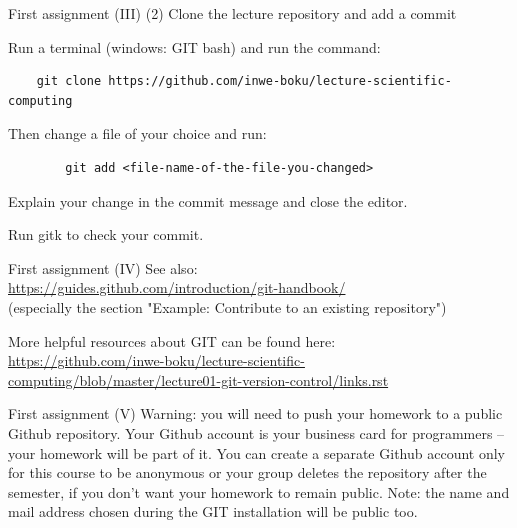 \documentclass[10pt,color=usenames,dvipsnames]{beamer}
\begin{document}
\begin{frame}[fragile]{First assignment (III)}
	(2) Clone the lecture repository and add a commit

	Run a terminal (windows: GIT bash) and run the command:

    {\small
        \begin{verbatim}
    git clone https://github.com/inwe-boku/lecture-scientific-computing
        \end{verbatim}
    }

	Then change a file of your choice and run:

	\begin{verbatim}
	    git add <file-name-of-the-file-you-changed>
	\end{verbatim}

	Explain your change in the commit message and close the editor.

	Run gitk to check your commit.

\end{frame}

\begin{frame}[fragile]{First assignment (IV)}
	See also:\\
	\href{https://guides.github.com/introduction/git-handbook/}{https://guides.github.com/introduction/git-handbook/}\\
	(especially the section "Example: Contribute to an existing repository")
    \bigskip

	More helpful resources about GIT can be found here:\\
	\href{https://github.com/inwe-boku/lecture-scientific-computing/blob/master/lecture01-git-version-control/links.rst}
	{https://github.com/inwe-boku/lecture-scientific-computing/blob/master/lecture01-git-version-control/links.rst}
\end{frame}

\begin{frame}{First assignment (V)}
    Warning: you will need to push your homework to a public Github repository. Your Github account
    is your business card for programmers -- your homework will be part of it. You can create a
    separate Github account only for this course to be anonymous or your group deletes the
    repository after the semester, if you don't want your homework to remain public. Note: the name
    and mail address chosen during the GIT installation will be public too.
\end{frame}
\end{document}

